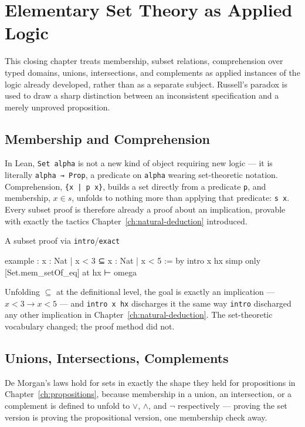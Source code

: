 \chapter{Elementary Set Theory as Applied Logic}
\label{ch:set-theory}

This closing chapter treats membership, subset relations,
comprehension over typed domains, unions, intersections, and
complements as applied instances of the logic already developed,
rather than as a separate subject. Russell's paradox is used to draw
a sharp distinction between an inconsistent specification and a
merely unproved proposition.

\section{Membership and Comprehension}

In Lean, \texttt{Set alpha} is not a new kind of object requiring
new logic — it is literally \texttt{alpha → Prop}, a predicate on
\texttt{alpha} wearing set-theoretic notation. Comprehension,
\texttt{\{x | p x\}}, builds a set directly from a predicate
\texttt{p}, and membership, $x \in s$, unfolds to nothing more
than applying that predicate: \texttt{s x}. Every subset proof is
therefore already a proof about an implication, provable with
exactly the tactics Chapter~\ref{ch:natural-deduction} introduced.

\begin{experiment}{A subset proof via \texttt{intro}/\texttt{exact}}
\begin{lean}
example : {x : Nat | x < 3} ⊆ {x : Nat | x < 5} := by
  intro x hx
  simp only [Set.mem_setOf_eq] at hx ⊢
  omega
\end{lean}
Unfolding $\subseteq$ at the definitional level, the goal is exactly
an implication — $x < 3 \to x < 5$ — and \texttt{intro x hx}
discharges it the same way \texttt{intro} discharged any other
implication in Chapter~\ref{ch:natural-deduction}. The set-theoretic
vocabulary changed; the proof method did not.
\end{experiment}

\section{Unions, Intersections, Complements}

De Morgan's laws hold for sets in exactly the shape they held for
propositions in Chapter~\ref{ch:propositions}, because membership in
a union, an intersection, or a complement is defined to unfold to
$\lor$, $\land$, and $\lnot$ respectively — proving the set version
is proving the propositional version, one membership check away.


